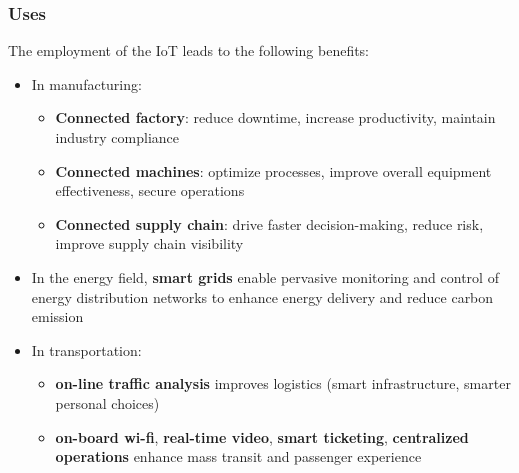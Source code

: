 \documentclass{beamer}
\begin{document}
\begin{frame}
	\frametitle{Uses}
	The employment of the IoT leads to the following benefits:
	\begin{itemize}
		\item<2-> In manufacturing:
		\begin{itemize}
			\item<2->\textbf{Connected factory}: reduce downtime, increase productivity, maintain industry compliance
			\item<2-> \textbf{Connected machines}: optimize processes, improve overall equipment effectiveness, secure operations
			\item<2-> \textbf{Connected supply chain}: drive faster decision-making, reduce risk, improve supply chain visibility
		\end{itemize}
	\item<3-> In the energy field, \textbf{smart grids} enable pervasive monitoring and control of energy distribution networks to enhance energy delivery and reduce carbon emission
	\item<4-> In transportation:
	\begin{itemize}
		\item<4-> \textbf{on-line traffic analysis} improves logistics (smart infrastructure, smarter personal choices)
		\item<4-> \textbf{on-board wi-fi}, \textbf{real-time video}, \textbf{smart ticketing}, \textbf{centralized operations} enhance mass transit and passenger experience
	\end{itemize}
	\end{itemize}
\end{frame}
\end{document}

